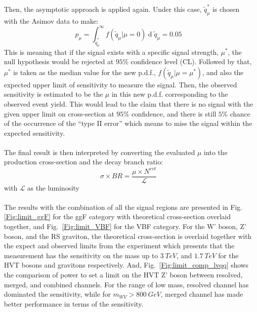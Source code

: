 \\
\\Then, the asymptotic approach is applied again. Under this case, $\tilde{q}_{\mu}^{*}$ is chosen with the Asimov data to make:
\begin{equation}
p_{\mu}=\int_{\tilde{q}_{\mu}^{*}}^{\infty}f(\tilde{q}_{\mu}|\mu=0)\operatorname{d}\tilde{q}_{\mu}=0.05
\end{equation}
\noindent
This is meaning that if the signal exists with a specific signal strength, $\mu^*$, the null hypothesis would be rejected at $95\%$ confidence level (CL). Followed by that, $\mu^*$ is taken as the median value for the new p.d.f., $f(\tilde{q}_{\mu}|\mu=\mu^*)$, and also the expected upper limit of sensitivity to measure the signal. Then, the observed sensitivity is estimated to be the $\mu$ in this new p.d.f. corresponding to the observed event yield. This would lead to the claim that there is no signal with the given upper limit on cross-section at $95\%$ confidence, and there is still $5\%$ chance of the occurrence of the ``type II error'' which means to miss the signal within the expected sensitivity. 
\\
\\The final result is then interpreted by converting the evaluated $\mu$ into the production cross-section and the decay branch ratio:
\begin{equation}
\sigma\times BR=\frac{\mu\times N^{evt}}{\mathcal{L}}
\end{equation}  
with $\mathcal{L}$ as the luminosity
\\
\\The results with the combination of all the signal regions are presented in Fig.~ \ref{Fig:limit_ggF} for the ggF category with theoretical cross-section overlaid together, and Fig.~\ref{Fig:limit_VBF} for the VBF category. For the W' boson, Z' boson, and the RS graviton, the theoretical cross-section is overlaid together with the expect and observed limits from the experiment which presents that the measurement has the sensitivity on the mass up to $3~TeV$, and $1.7~TeV$ for the HVT bosons and gravitons respectively. And, Fig.~\ref{Fig:limit_comp_lvqq} shows the comparison of power to set a limit on the HVT Z' boson between resolved, merged, and combined channels. For the range of low mass, resolved channel has dominated the sensitivity, while for $m_{WV}>800~GeV$, merged channel has made better performance in terms of the sensitivity.

